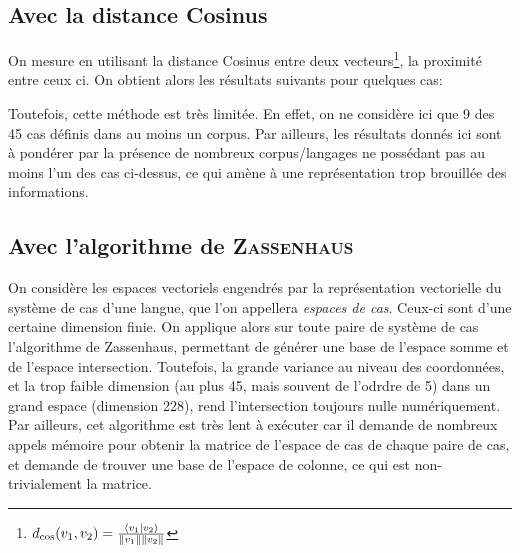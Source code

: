 \documentclass{cours}
\newcommand{\codedir}{Morphosyntactic-Categories_Code}
\begin{document}
    \subsection{Avec la distance Cosinus}
    On mesure en utilisant la distance Cosinus entre deux vecteurs\footnote{$d_{\cos}(v_{1},v_{2}) = \frac{\left\langle v_{1}\mid v_{2} \right\rangle}{\left\lVert v_{1} \right\rVert\left\lVert v_{2} \right\rVert}$}, la proximité entre ceux ci. On obtient alors les résultats suivants pour quelques cas:


    

    

    

    

    

    

    

    Toutefois, cette méthode est très limitée. En effet, on ne considère ici que 9 des 45 cas définis dans au moins un corpus. Par ailleurs, les résultats donnés ici sont à pondérer par la présence de nombreux corpus/langages ne possédant pas au moins l'un des cas ci-dessus, ce qui amène à une représentation trop brouillée des informations.

    \subsection{Avec l'algorithme de \textsc{Zassenhaus}}
    On considère les espaces vectoriels engendrés par la représentation vectorielle du système de cas d'une langue, que l'on appellera \textit{espaces de cas}.
    Ceux-ci sont d'une certaine dimension finie.
    On applique alors sur toute paire de système de cas l'algorithme de Zassenhaus, permettant de générer une base de l'espace somme et de l'espace intersection.
    Toutefois, la grande variance au niveau des coordonnées, et la trop faible dimension (au plus 45, mais souvent de l'odrdre de 5) dans un grand espace (dimension 228), rend l'intersection toujours nulle numériquement.
    Par ailleurs, cet algorithme est très lent à exécuter car il demande de nombreux appels mémoire pour obtenir la matrice de l'espace de cas de chaque paire de cas, et demande de trouver une base de l'espace de colonne, ce qui est non-trivialement la matrice.
\end{document}
